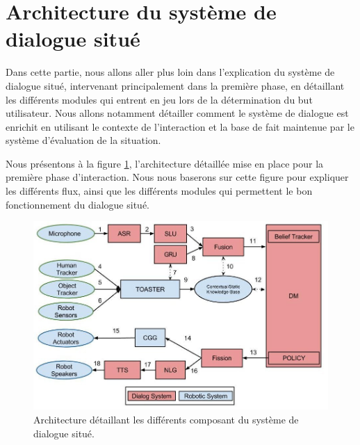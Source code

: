 \documentclass[a4paper,11pt,twoside]{StyleThese}
\begin{document}




\section{Architecture du système de dialogue situé}

Dans cette partie, nous allons aller plus loin dans l'explication du système de dialogue situé, intervenant principalement dans la première phase, en détaillant les différents modules qui entrent en jeu lors de la détermination du but utilisateur. Nous allons notamment détailler comment le système de dialogue est enrichit en utilisant le contexte de l'interaction et la base de fait maintenue par le système d'évaluation de la situation.

Nous présentons à la figure \ref{fig:archiphase1}, l'architecture détaillée mise en place pour la première phase d'interaction. Nous nous baserons sur cette figure pour expliquer les différents flux, ainsi que les différents modules qui permettent le bon fonctionnement du dialogue situé.


\begin{figure}[ht!]
 \centering
  \includegraphics[width=0.89\linewidth]{./img/archiphase1.jpg} 
  \caption {Architecture détaillant les différents composant du système de dialogue situé.}
  \label{fig:archiphase1}
\end{figure}
\end{document}
